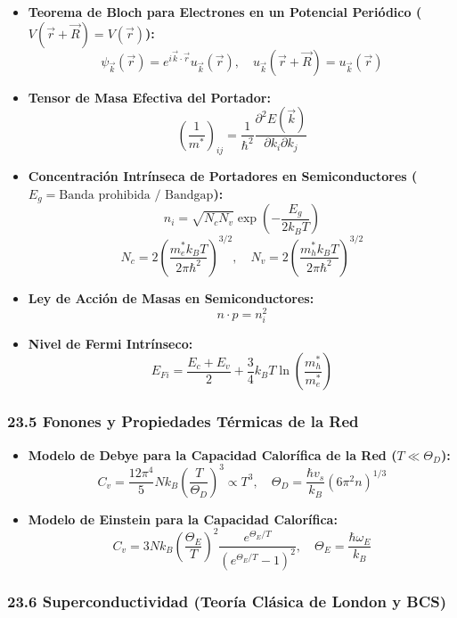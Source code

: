 \documentclass[11pt,a4paper]{article}
\begin{document}
\begin{itemize}
  \item \textbf{Teorema de Bloch para Electrones en un Potencial Periódico ($V(\vec{r} + \vec{R}) = V(\vec{r})$):}
  \[
    \psi_{\vec{k}}(\vec{r}) = e^{i\vec{k} \cdot \vec{r}} u_{\vec{k}}(\vec{r}), \quad u_{\vec{k}}(\vec{r} + \vec{R}) = u_{\vec{k}}(\vec{r})
  \]
  \item \textbf{Tensor de Masa Efectiva del Portador:}
  \[
    \left( \frac{1}{m^*} \right)_{ij} = \frac{1}{\hbar^2} \frac{\partial^2 E(\vec{k})}{\partial k_i \partial k_j}
  \]
  \item \textbf{Concentración Intrínseca de Portadores en Semiconductores ($E_g = \text{Banda prohibida / Bandgap}$):}
  \[
    n_i = \sqrt{N_c N_v} \exp\left( -\frac{E_g}{2 k_B T} \right)
  \]
  \[
    N_c = 2\left( \frac{m_e^* k_B T}{2\pi\hbar^2} \right)^{3/2}, \quad N_v = 2\left( \frac{m_h^* k_B T}{2\pi\hbar^2} \right)^{3/2}
  \]
  \item \textbf{Ley de Acción de Masas en Semiconductores:}
  \[
    n \cdot p = n_i^2
  \]
  \item \textbf{Nivel de Fermi Intrínseco:}
  \[
    E_{Fi} = \frac{E_c + E_v}{2} + \frac{3}{4} k_B T \ln\left( \frac{m_h^*}{m_e^*} \right)
  \]
\end{itemize}

\subsubsection*{23.5 Fonones y Propiedades Térmicas de la Red}

\begin{itemize}
  \item \textbf{Modelo de Debye para la Capacidad Calorífica de la Red ($T \ll \Theta_D$):}
  \[
    C_v = \frac{12\pi^4}{5} N k_B \left( \frac{T}{\Theta_D} \right)^3 \propto T^3, \quad \Theta_D = \frac{\hbar v_s}{k_B}(6\pi^2 n)^{1/3}
  \]
  \item \textbf{Modelo de Einstein para la Capacidad Calorífica:}
  \[
    C_v = 3 N k_B \left( \frac{\Theta_E}{T} \right)^2 \frac{e^{\Theta_E / T}}{(e^{\Theta_E / T} - 1)^2}, \quad \Theta_E = \frac{\hbar\omega_E}{k_B}
  \]
\end{itemize}

\subsubsection*{23.6 Superconductividad (Teoría Clásica de London y BCS)}
\end{document}
